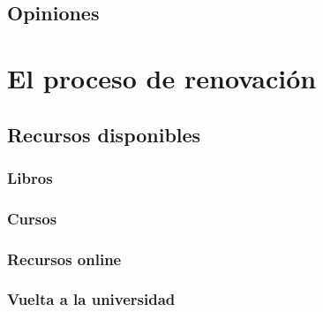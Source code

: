 \documentclass[11pt, a4paper]{report}
\begin{document}
            

		\subsection{Opiniones}
        	\paragraph{}
            
            
    \section{El proceso de renovación}
    
    	\subsection{Recursos disponibles}
        \label{subsec:RecursosDisponibles}

    		\paragraph{} 
            
        	\subsubsection{Libros}
        		\paragraph{} 

    		\subsubsection{Cursos}
        		\paragraph{}
        	
    		\subsubsection{Recursos online}
        		\paragraph{}
        	
    		\subsubsection{Vuelta a la universidad}
\end{document}

